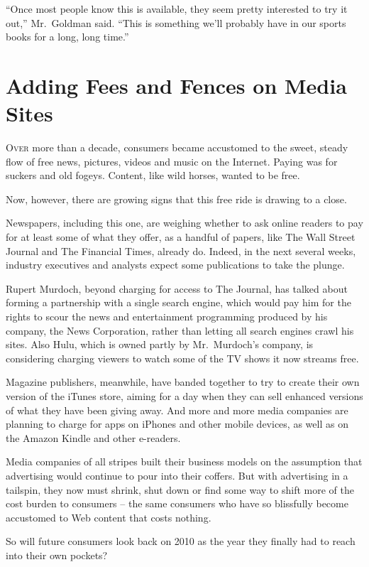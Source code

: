 ﻿\documentclass[12pt]{article}
\begin{document}
``Once most people know this is available, they seem pretty interested to try it out,'' Mr.~Goldman
said. ``This is something we'll probably have in our sports books for a long, long time.''

\section{Adding Fees and Fences on Media Sites}

\lettrine{O}{ver} more than a decade, consumers became accustomed to the
sweet, steady flow of free news, pictures, videos and music on the Internet. Paying was for suckers
and old fogeys. Content, like wild horses, wanted to be free.

Now, however, there are growing signs that this free ride is drawing to a close.

Newspapers, including this one, are weighing whether to ask online readers to pay for at least some
of what they offer, as a handful of papers, like The Wall Street Journal and The Financial Times,
already do. Indeed, in the next several weeks, industry executives and analysts expect some
publications to take the plunge.

Rupert Murdoch, beyond charging for access to The Journal, has talked about forming a partnership
with a single search engine, which would pay him for the rights to scour the news and entertainment
programming produced by his company, the News Corporation, rather than letting all search engines
crawl his sites. Also Hulu, which is owned partly by Mr.~Murdoch's company, is considering charging
viewers to watch some of the TV shows it now streams free.

Magazine publishers, meanwhile, have banded together to try to create their own version of the
iTunes store, aiming for a day when they can sell enhanced versions of what they have been giving
away. And more and more media companies are planning to charge for apps on iPhones and other mobile
devices, as well as on the Amazon Kindle and other e-readers.

Media companies of all stripes built their business models on the assumption that advertising would
continue to pour into their coffers. But with advertising in a tailspin, they now must shrink, shut
down or find some way to shift more of the cost burden to consumers -- the same consumers who have
so blissfully become accustomed to Web content that costs nothing.

So will future consumers look back on 2010 as the year they finally had to reach into their own
pockets?
\end{document}
